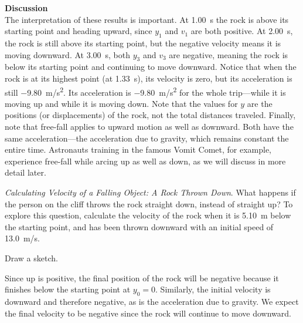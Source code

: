 \documentclass[../../main-ap-physics.tex]{subfiles}
\begin{document}
\textbf{Discussion}\\
The interpretation of these results is important. At \SI{1.00}{s} the rock is above its starting point and heading upward, since $y_1$ and $v_1$ are both positive. At \SI{2.00}{s}, the rock is still above its starting point, but the negative velocity means it is moving downward. At \SI{3.00}{s}, both $y_3$ and $v_3$ are negative, meaning the rock is below its starting point and continuing to move downward. Notice that when the rock is at its highest point (at \SI{1.33}{s}), its velocity is zero, but its acceleration is still \SI{-9.80}{m/s^2}. Its acceleration is \SI{-9.80}{m/s^2} for the whole trip---while it is moving up and while it is moving down. Note that the values for $y$ are the positions (or displacements) of the rock, not the total distances traveled. Finally, note that free-fall applies to upward motion as well as downward. Both have the same acceleration---the acceleration due to gravity, which remains constant the entire time. Astronauts training in the famous Vomit Comet, for example, experience free-fall while arcing up as well as down, as we will discuss in more detail later.

\endsolution

\vspace{1em} %

\begin{example}
    \textit{Calculating Velocity of a Falling Object: A Rock Thrown Down}. What happens if the person on the cliff throws the rock straight down, instead of straight up? To explore this question, calculate the velocity of the rock when it is \SI{5.10}{m} below the starting point, and has been thrown downward with an initial speed of \SI{13.0}{m/s}.
\end{example}

\Solution Draw a sketch.

\begin{center}
\end{center}

Since up is positive, the final position of the rock will be negative because it finishes below the starting point at $y_0 = 0$. Similarly, the initial velocity is downward and therefore negative, as is the acceleration due to gravity. We expect the final velocity to be negative since the rock will continue to move downward.
\end{document}
